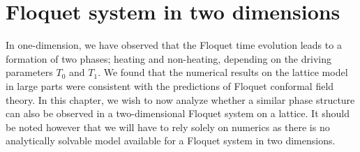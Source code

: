 \documentclass[11pt, a4paper, oneside]{book}
\theoremstyle{definition} %
\begin{document}







\chapter{Floquet system in two dimensions}
In one-dimension, we have observed that the Floquet time evolution leads to a formation of two phases; heating and non-heating, depending on the driving parameters $T_0$ and $T_1$. We found that the numerical results on the lattice model in large parts were consistent with the predictions of Floquet conformal field theory. In this chapter, we wish to now analyze whether a similar phase structure can also be observed in a two-dimensional Floquet system on a lattice. It should be noted however that we will have to rely solely on numerics as there is no analytically solvable model available for a Floquet system in two dimensions.\\
\end{document}
